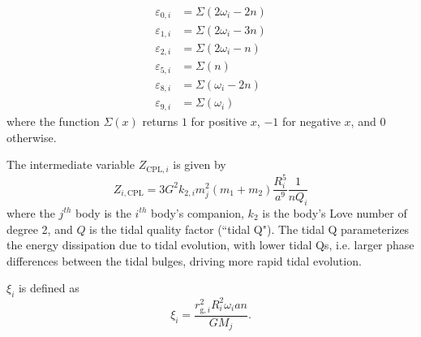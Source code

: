 \documentclass[twocolumn]{aastex61}
\begin{document}
\begin{equation} \label{eqn:cpl_eps}
\begin{split}
\varepsilon_{0,i} & = \Sigma(2 \omega_i - 2n) \\
\varepsilon_{1,i} & = \Sigma(2 \omega_i - 3n) \\
\varepsilon_{2,i} & = \Sigma(2 \omega_i - n) \\
\varepsilon_{5,i} & = \Sigma(n) \\
\varepsilon_{8,i} & = \Sigma(\omega_i - 2n) \\
\varepsilon_{9,i} & = \Sigma(\omega_i)
\end{split}
\end{equation}
where the function $\Sigma(x)$ returns $1$ for positive $x$, $-1$ for negative $x$, and $0$ otherwise.

The intermediate variable $Z_{\mathrm{CPL},i}$ is given by
\begin{equation} \label{eqn:cpl_z}
Z_{i,\mathrm{CPL}} = 3 G^2 k_{2,i} m_j^2 (m_1 + m_2) \frac{R_i^5}{a^9} \frac{1}{n Q_i}
\end{equation}
where the $j^{th}$ body is the $i^{th}$ body's companion, $k_{2}$ is the body's Love number of degree 2, and $Q$ is the tidal quality factor (``tidal Q"). The tidal Q parameterizes the energy dissipation due to tidal evolution, with lower tidal Qs, i.e. larger phase differences between the tidal bulges, driving more rapid tidal evolution.

$\xi_i$ is defined as
\begin{equation}\label{eqn:cpl_chi}
\xi_i = \frac{r_{\mathrm{g},i}^2 R_i^2 \omega_i a n }{ G M_j}.
\end{equation}
\end{document}
